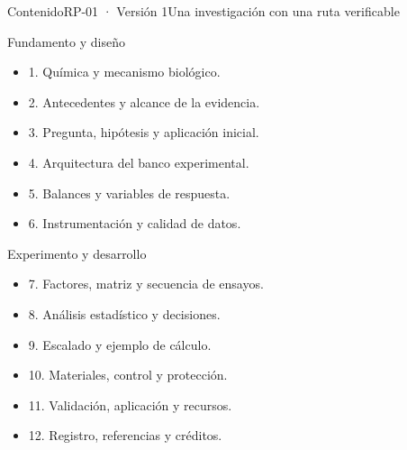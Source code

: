 \documentclass{../plantilla/hvtbook}
\begin{document}
\HVTMakeTitle

\begin{HVTPage}{Contenido}{RP-01 · Versión 1}{Una investigación con una ruta verificable}
\begin{HVTGrid}
\begin{HVTColumn}{Fundamento y diseño}
\begin{itemize}
\item 1. Química y mecanismo biológico.
\item 2. Antecedentes y alcance de la evidencia.
\item 3. Pregunta, hipótesis y aplicación inicial.
\item 4. Arquitectura del banco experimental.
\item 5. Balances y variables de respuesta.
\item 6. Instrumentación y calidad de datos.
\end{itemize}
\end{HVTColumn}
\begin{HVTColumn}{Experimento y desarrollo}
\begin{itemize}
\item 7. Factores, matriz y secuencia de ensayos.
\item 8. Análisis estadístico y decisiones.
\item 9. Escalado y ejemplo de cálculo.
\item 10. Materiales, control y protección.
\item 11. Validación, aplicación y recursos.
\item 12. Registro, referencias y créditos.
\end{itemize}
\end{HVTColumn}
\end{HVTGrid}
\end{HVTPage}
\end{document}
